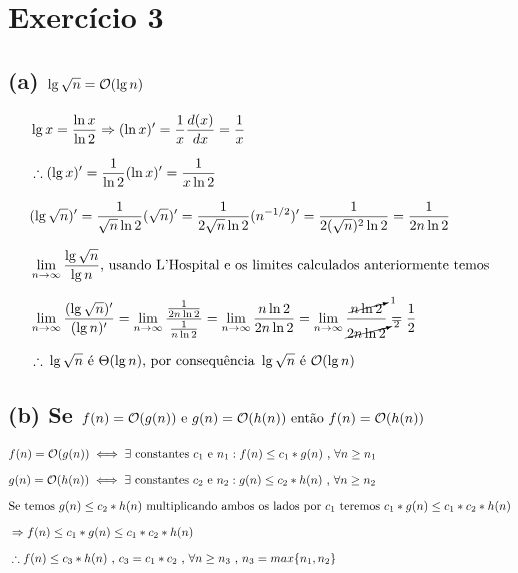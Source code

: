 \section*{Exercício 3}

\subsection*{(a) $\lg \sqrt{n} = \mathcal{O}(\lg n)$}

\begin{equation*}
  \setlength{\jot}{10pt}
  \begin{aligned}
    &\lg x = \frac{\ln x}{\ln 2} \Rightarrow (\ln x)' = \frac{1}{x}\frac{d(x)}{dx} = \frac{1}{x} \\
    &\therefore (\lg x)' = \frac{1}{\ln 2}(\ln x)' = \frac{1}{x\ln 2} \\
    & (\lg \sqrt{n})' = \frac{1}{\sqrt{n}\ln 2}(\sqrt{n})' = \frac{1}{2\sqrt{n}\ln 2}(n^{-1/2})' = \frac{1}{2(\sqrt{n})^2\ln 2} = \frac{1}{2n\ln 2} \\
    &\lim_{n \to\infty} \frac{\lg \sqrt{n}}{\lg n} \text{, usando L'Hospital e os limites calculados anteriormente temos} \\
    &\lim_{n \to\infty} \frac{(\lg \sqrt{n})'}{(\lg n)'} = \lim_{n \to\infty} \frac{\frac{1}{2n\ln 2}}{\frac{1}{n\ln 2}} = \lim_{n \to\infty} \frac{n\ln 2}{2n\ln 2} = \lim_{n \to\infty} \frac{\cancelto{1}{n\ln 2}}{\cancelto{2}{2n\ln 2}} = \frac{1}{2} \\
    &\therefore\: \lg \sqrt{n} \text{ é } \Theta(\lg n) \text{, por consequência } \lg \sqrt{n} \text{ é } \bigO(\lg n)
\end{aligned}\end{equation*}


\subsection*{(b) Se $f(n) = \mathcal{O}(g(n)) \text{ e } g(n) = \mathcal{O}(h(n)) \text{ então } f(n) = \mathcal{O}(h(n))$}

\begin{equation*}
  \setlength{\jot}{10pt}
  \begin{aligned}
    &f(n) = \bigO(g(n)) \iff \exists \text{ constantes $c_1$ e $n_1$}: f(n) \leq c_{1}*g(n) \text{ , } \forall n \geq n_1 \\
    &g(n) = \bigO(h(n)) \iff \exists \text{ constantes $c_2$ e $n_2$}: g(n) \leq c_{2}*h(n) \text{ , } \forall n \geq n_2 \\
    &\text{Se temos } g(n) \leq c_{2}*h(n) \text{ multiplicando ambos os lados por $c_1$ teremos } c_{1}*g(n) \leq c_{1}*c_{2}*h(n) \\
    &\Rightarrow f(n) \leq c_{1}*g(n) \leq c_{1}*c_{2}*h(n) \\
    &\therefore f(n) \leq c_3*h(n) \text{ , } c_3 = c_{1}*c_{2} \text{ , } \forall n \geq n_3 \text{ , } n_3 = max\{n_1, n_2\}
\end{aligned}\end{equation*}

